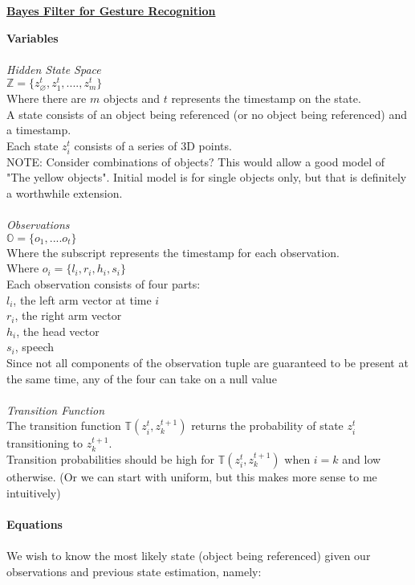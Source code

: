 \documentclass[12pt,letterpaper]{article}
\begin{document}
\begin{center}\textbf{\underline{Bayes Filter for Gesture Recognition}}\end{center}
\textbf{Variables}\\\\
\textit{Hidden State Space}\\
$\mathbb{Z} = \{z^t_\varnothing, z^t_1, ...., z^t_m\}$\\
Where there are $m$ objects and $t$ represents the timestamp on the state.\\
A state consists of an object being referenced (or no object being referenced) and a timestamp.\\
Each state $z^t_i$ consists of a series of 3D points.\\
NOTE: Consider combinations of objects? This would allow a good model of "The yellow objects". Initial model is for single objects only, but that is definitely a worthwhile extension.\\\\
\textit{Observations}\\
$\mathbb{O} = \{o_1, .... o_t\}$\\
Where the subscript represents the timestamp for each observation.\\
Where $o_i= \{l_i,r_i, h_i, s_i\}$\\
Each observation consists of four parts:\\
$l_i$, the left arm vector at time $i$\\
$r_i$, the right arm vector\\
$h_i$, the head vector\\
$s_i$, speech\\
Since not all components of the observation tuple are guaranteed to be present at the same time, any of the four can take on a null value\\\\
\textit{Transition Function}\\
The transition function $\mathbb{T}(z^t_i, z^{t+1}_k)$ returns the probability of state $z^t_i$ transitioning to $z^{t+1}_k$.\\
Transition probabilities should be high for $\mathbb{T}(z_i^t,z^{t+1}_k)$ when $i=k$ and low otherwise. (Or we can start with uniform, but this makes more sense to me intuitively)\\\\
\textbf{Equations}\\\\
We wish to know the most likely state (object being referenced) given our observations and previous state estimation, namely:\\
\end{document}
